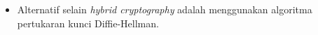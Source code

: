 \documentclass{article}
\begin{document}

\begin{itemize}
  \item Alternatif selain \textit{hybrid cryptography} adalah menggunakan algoritma pertukaran kunci Diffie-Hellman.
\end{itemize}
\end{document}
